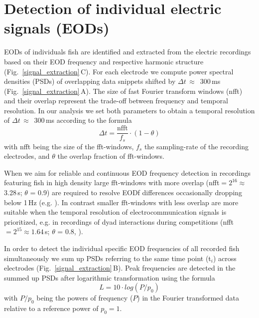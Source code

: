 \documentclass[11pt,pdftex]{article}
\newcommand{\panel}[1]{\textsf{#1}}
\newcommand{\subfref}[2]{\textup{\ref{#1}}\,\panel{#2}}
\newcommand{\fig}{Fig.}
\newcommand{\subfigref}[2]{\fig~\subfref{#1}{#2}}
\begin{document}
%

\section{Detection of individual electric signals (EODs)}

EODs of individuals fish are identified and extracted from the electric recordings based on their EOD frequency and respective harmonic structure (\subfigref{signal_extraction}{C}). For each electrode we compute power spectral densities (PSDs) of overlapping data snippets shifted by $\Delta t$\,$\approx$\, 300\,ms (\subfigref{signal_extraction}{A}). The size of fast Fourier transform windows (nfft) and their overlap represent the trade-off between frequency and temporal resolution. In our analysis we set both parameters to obtain a temporal resolution of $\Delta t$\,$\approx$\, 300\,ms according to the formula
\begin{equation}
\Delta t = \frac{\text{nfft}}{f_s} \cdot (1-\theta) 
\end{equation}
with nfft being the size of the fft-windows, $f_s$ the sampling-rate of the recording electrodes, and $\theta$ the overlap fraction of fft-windows. 

When we aim for reliable and continuous EOD frequency detection in recordings featuring fish in high density large fft-windows with more overlap (nfft$=2^{16} \approx$  3.28\,s; $\theta$ = 0.9) are required to resolve EODf differences occasionally dropping below 1\,Hz (e.g. \citealp{Raab2019}). In contrast smaller fft-windows with less overlap are more suitable when the temporal resolution of electrocommunication signals is prioritized, e.g. in recordings of dyad interactions during competitions (nfft$=2^{15} \approx  1.64$\,s; $\theta$ = 0.8, \citealp{Raab2021}). 


In order to detect the individual specific EOD frequencies of all recorded fish simultaneously we sum up PSDs referring to the same time point (t$_i$) across electrodes (\subfigref{signal_extraction}{B}). Peak frequencies are detected in the summed up PSDs after logarithmic transformation \citep{Todd1999, Henninger2020} using the formula
\begin{equation}
L = 10 \cdot log(P/p_0)
\end{equation}
with $P/p_0$ being the powers of frequency ($P$) in the Fourier transformed data relative to a reference power of $p_0 = 1$. 
\end{document}

